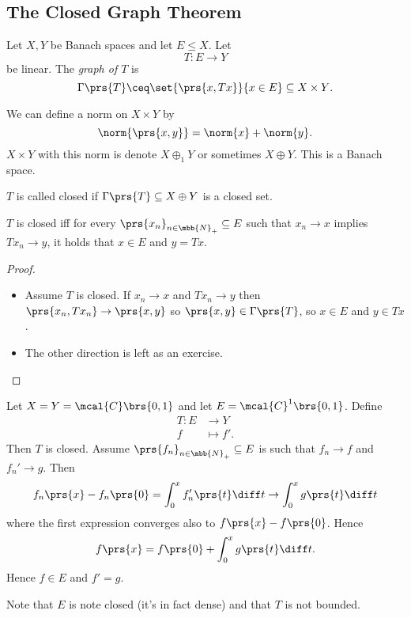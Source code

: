 \documentclass[10pt, twoside]{book}
\begin{document}
\subsection{The Closed Graph Theorem}

\begin{definition}
Let $X,Y$ be Banach spaces and let $E \leq X$. Let
\[T \colon E \to Y\]
be linear. The \emph{graph of $T$} is
\[\Gamma\prs{T} \ceq \set{\prs{x, Tx}}{x \in E} \subseteq X \times Y \text{.}\]
\end{definition}

\begin{remark}
We can define a norm on $X \times Y$ by
\[\norm{\prs{x,y}} = \norm{x} + \norm{y} \text{.}\]
$X \times Y$ with this norm is denote $X \oplus_1 Y$ or sometimes $X \oplus Y$. This is a Banach space.
\end{remark}

\begin{definition}
$T$ is called closed if $\Gamma\prs{T} \subseteq X \oplus Y$ is a closed set.
\end{definition}

\begin{proposition}
$T$ is closed iff for every $\prs{x_n}_{n \in \mbb{N}_+} \subseteq E$ such that $x_n \to x$ implies $T x_n \to y$, it holds that $x \in E$ and $y = Tx$.
\end{proposition}

\begin{proof}
\begin{itemize}
\item Assume $T$ is closed.
If $x_n \to x$ and $T x_n \to y$ then $\prs{x_n, T x_n} \to \prs{x,y}$ so $\prs{x,y} \in \Gamma\prs{T}$, so $x \in E$ and $y \in Tx$.
\item The other direction is left as an exercise.
\end{itemize}
\end{proof}

\begin{example}
Let $X=Y = \mcal{C}\brs{0,1}$ and let $E = \mcal{C}^1\brs{0,1}$.
Define
\begin{align*}
T \colon E &\to Y \\
f &\mapsto f' \text{.}
\end{align*}
Then $T$ is closed. Assume $\prs{f_n}_{n \in \mbb{N}_+} \subseteq E$ is such that $f_n \to f$ and $f_n' \to g$. Then
\[f_n\prs{x} - f_n\prs{0} = \int_0^x f_n'\prs{t} \diff t \to \int_0^x g\prs{t} \diff t\]
where the first expression converges also to $f\prs{x} - f\prs{0}$.
Hence
\[f\prs{x} = f\prs{0} + \int_0^x g\prs{t} \diff t \text{.}\]
Hence $f \in E$ and $f' = g$.

Note that $E$ is note closed (it's in fact dense) and that $T$ is not bounded.
\end{example}
\end{document}

